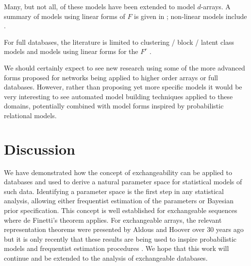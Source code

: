 Many, but not all, of these models have been extended to model $d$-arrays.
A summary of models using linear forms of $F$ is given in \cite{Kolda2009-ba}; non-linear models include \cite{Xu2012-ub} .

For full databases, the literature is limited to clustering / block / latent class models \cite{Kemp2006-jt, Xu2006-uy} and models using linear forms for the $F^r$ \citep[e.g.][]{Lippert2008-gg, Singh2008-cb, Singh2008-qw, Jimeng2009-rw, Acar2011-vg, Gallinari2011-ac, Nickel2011-pi, Acar2012-no, Ermis2012-gk, Shangguan2012-ga, Singh2012-jj, Acar2013-na, Andersen2013-rg, Yin2013-we}.

We should certainly expect to see new research using some of the more advanced forms proposed for networks being applied to higher order arrays or full databases.
However, rather than proposing yet more specific models it would be very interesting to see automated model building techniques applied to these domains, potentially combined with model forms inspired by probabilistic relational models.

\section{Discussion}

We have demonstrated how the concept of exchangeability can be applied to databases and used to derive a natural parameter space for statistical models of such data.
Identifying a parameter space is the first step in any statistical analysis, allowing either frequentist estimation of the parameters or Bayesian prior specification.
This concept is well established for exchangeable sequences where de Finetti's theorem applies.
For exchangeable arrays, the relevant representation theorems were presented by Aldous and Hoover \cite{Aldous1981-lg, Hoover1979-br} over 30 years ago but it is only recently that these results are being used to inspire probabilistic models \cite{Hoff2007-ja, Roy2009-ge, Lloyd2012-sb} and frequentist estimation procedures \cite{Kallenberg1999-pj, Choi2013-th, Wolfe2013-vs}.
We hope that this work will continue and be extended to the analysis of exchangeable databases.



\outbpdocument{


}
